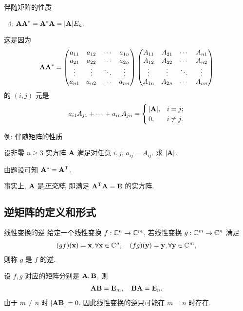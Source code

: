 \begin{frame}{伴随矩阵的性质}
	\begin{alertblock@}
		\begin{enumerate}
			\setcounter{enumi}{3}
			\item ${\mathbf{A}}{\mathbf{A}}^*={\mathbf{A}}^*{\mathbf{A}}=|{\mathbf{A}}|E_n$.
		\end{enumerate}
	\end{alertblock@}
	\onslide<+->
	这是因为
	\[{\mathbf{A}}{\mathbf{A}}^*=\begin{pmatrix}
		a_{11}&a_{12}&\cdots &a_{1n}\\
		a_{21}&a_{22}&\cdots &a_{2n}\\
		\vdots&\vdots&\ddots&\vdots\\
		a_{n1}&a_{n2}&\cdots &a_{nn}
	\end{pmatrix}\begin{pmatrix}
		A_{11}&A_{21}&\cdots&A_{n1}\\
		A_{12}&A_{22}&\cdots&A_{n2}\\
		\vdots&\vdots&\ddots&\vdots\\
		A_{1n}&A_{2n}&\cdots&A_{nn}
	\end{pmatrix}\]
	\onslide<+->
	的 $(i,j)$ 元是
	\[a_{i1}A_{j1}+\cdots+a_{in}A_{jn}=\begin{cases}
		|{\mathbf{A}}|,&i=j;\\
		0,&i\neq j.
	\end{cases}\]
\end{frame}


\begin{frame}{例: 伴随矩阵的性质}
	\onslide<+->
	\begin{example}
		设非零 $n\ge 3$ 实方阵 ${\mathbf{A}}$ 满足对任意 $i,j$, $a_{ij}=A_{ij}$. 求 $|{\mathbf{A}}|$.
	\end{example}
	\onslide<+->
	\begin{solution}
		由题设可知 ${\mathbf{A}}^*={\mathbf{A}}^{\mathrm{T}}$.
		\onslide<+->{%
			因此 $|\bfA|=|\bfA^*|=|\bfA|^{n-1}$.
		}

	\end{solution}
	\onslide<+->
	事实上, ${\mathbf{A}}$ 是\emph{正交阵}, 即满足 ${\mathbf{A}}^{\mathrm{T}}{\mathbf{A}}={\mathbf{E}}$ 的实方阵.
\end{frame}



\subsection{逆矩阵的定义和形式}
\begin{frame}{线性变换的逆}
	\onslide<+->
	给定一个线性变换 $f:{\mathbb{C}}^n\rightarrow{\mathbb{C}}^m$, 若线性变换 $g:{\mathbb{C}}^m\to{\mathbb{C}}^n$ 满足
	\[(gf)({\mathbf{x}})={\mathbf{x}},\forall {\mathbf{x}}\in{\mathbb{C}}^n,\quad
	(fg)({\mathbf{y}})={\mathbf{y}},\forall {\mathbf{y}}\in{\mathbb{C}}^m,\]
	\onslide<+->
	则称 $g$ 是 $f$ 的逆.

	\onslide<+->
	设 $f,g$ 对应的矩阵分别是 ${\mathbf{A}},{\mathbf{B}}$, 则
	\[{\mathbf{A}}{\mathbf{B}}={\mathbf{E}}_m,\quad {\mathbf{B}}{\mathbf{A}}={\mathbf{E}}_n.\]
	\onslide<+->
	由于 $m\neq n$ 时 $|{\mathbf{A}}{\mathbf{B}}|=0$.
	\onslide<+->
	因此线性变换的逆只可能在 $m=n$ 时存在.
\end{frame}


